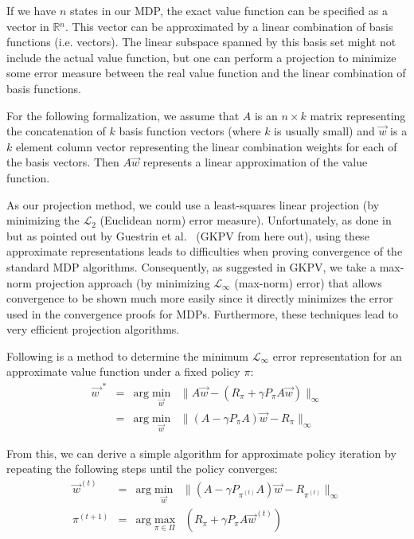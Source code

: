 If we have $n$ states in our MDP, the exact value function can be specified 
as a vector in $\mathbb{R}$${}^{n}$.  This vector can be approximated by a linear
combination of basis functions (i.e. vectors).  The 
linear subspace spanned by this basis set might not include the
actual value function, but one can perform a projection to minimize
some error measure between the real value function and the linear
combination of basis functions.  

For the following formalization, we assume that $A$ is an $n \times k$ 
matrix representing the concatenation of $k$ basis function vectors (where
$k$ is usually small) and $\vec{w}$
is a $k$ element column vector representing the linear combination weights for each 
of the basis vectors.  Then $A \vec{w}$ represents a linear approximation of the
value function.  

As our projection method, we could use a least-squares linear projection (by minimizing
the $\mathcal{L}$${}_2$ (Euclidean norm) error measure).
Unfortunately, as done in ~\cite{kp1,kp2} but as pointed out by Guestrin 
et al.~\cite{gkp,gkpv} (GKPV from here out), using these approximate representations
leads to difficulties when proving convergence
of the standard MDP algorithms.
Consequently, as suggested in GKPV, we take a max-norm projection
approach (by minimizing $\mathcal{L}_{\infty}$ (max-norm) error) 
that allows convergence to be shown much more easily since it directly minimizes
the error used in the convergence proofs for MDPs.  Furthermore, these techniques lead to
very efficient projection algorithms. 

Following is a method to determine the minimum $\mathcal{L}_{\infty}$ error representation for
an approximate value function under a fixed policy $\pi$:
\begin{eqnarray}
\vec{w\;}^* & = & \textrm{arg} \min_{\vec{w}} \; \; \| A \vec{w} - (R_{\pi} + \gamma P_{\pi} A \vec{w})  \|_{\infty} \nonumber \\
        & = & \textrm{arg} \min_{\vec{w}} \; \; \| (A  - \gamma P_{\pi} A) \vec{w} - R_{\pi}  \|_{\infty}
\end{eqnarray}

From this, we can derive a simple algorithm for approximate policy iteration by
repeating the following steps until the policy converges:
\begin{eqnarray}
\vec{w}^{(t)}   & = &  \textrm{arg} \min_{\vec{w}}     \; \; \|   (A  - \gamma P_{\pi^{(t)}} A) \vec{w} - R_{\pi^{(t)}}  \|_{\infty} \label{mproject} \\
\pi^{(t+1)}     & = &  \textrm{arg} \max_{\pi \in \Pi} \; \; (R_{\pi} + \gamma P_{\pi} A \vec{w}^{(t)}) 
\end{eqnarray}

